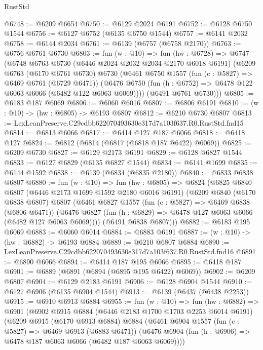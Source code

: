 \begin{lexlean}{RustStd}
\begin{coremodule}
@6748 := @6209 @6654
@6750 := @6129 @2024 @6191
@6752 := @6128 @6750 @1544
@6756 := @6127 @6752 (@6135 @6750 @1544)
@6757 := @6141 @2032
@6758 := @6144 @2034
@6761 := @6139 (@6757 (@6758 @2170))
@6763 := @6756 @6761 @6730
@6803 := fun (w : @10) =>
  fun (hw : @6728) =>
  @6747
    (@6748
      @6763
      @6730
      (@6446 @2024 @2032 @2034 @2170 @6018 @6191)
      (@6209
        @6763
        (@6170 @6761 @6730)
        @6730
        (@6461
          @6750
          @1557
          (fun (c : @5827) => @6469 @6761 (@6729 @6471))
          (@6476 @6750 (fun (h : @6752) => @6478 @122 @6063 @6066 (@6482 @122 @6063 @6069))))
        (@6491 @6761 @6730)))
@6805 := @6183 @187 @6069
@6806 := @6060 @6016
@6807 := @6806 @6191
@6810 := (w : @10) -> (hw : @6805) -> @6193 @6807
@6812 := @6210 @6730 @6807
@6813 := LexLeanPreserve.C29cdbb622070493630e317d7a103f637.R0.RustStd.fnd15
@6814 := @6813 @6066
@6817 := @6414 @127 @187 @6066
@6818 := @6418 @127
@6824 := @6812 (@6814 (@6817 (@6818 @187 @6422) @6069))
@6825 := @6209 @6730
@6827 := @6129 @2173 @6191
@6829 := @6128 @6827 @1544
@6833 := @6127 @6829 (@6135 @6827 @1544)
@6834 := @6141 @1699
@6835 := @6144 @1592
@6838 := @6139 (@6834 (@6835 @2180))
@6840 := @6833 @6838 @6807
@6880 := fun (w : @10) =>
  fun (hw : @6805) =>
  @6824
    (@6825
      @6840
      @6807
      (@6446 @2173 @1699 @1592 @2180 @6016 @6191)
      (@6209
        @6840
        (@6170 @6838 @6807)
        @6807
        (@6461
          @6827
          @1557
          (fun (c : @5827) => @6469 @6838 (@6806 @6471))
          (@6476 @6827 (fun (h : @6829) => @6478 @127 @6063 @6066 (@6482 @127 @6063 @6069))))
        (@6491 @6838 @6807)))
@6882 := @6183 @195 @6069
@6883 := @6060 @6014
@6884 := @6883 @6191
@6887 := (w : @10) -> (hw : @6882) -> @6193 @6884
@6889 := @6210 @6807 @6884
@6890 := LexLeanPreserve.C29cdbb622070493630e317d7a103f637.R0.RustStd.fnd16
@6891 := @6890 @6066
@6894 := @6414 @187 @195 @6066
@6895 := @6418 @187
@6901 := @6889 (@6891 (@6894 (@6895 @195 @6422) @6069))
@6902 := @6209 @6807
@6904 := @6129 @2183 @6191
@6906 := @6128 @6904 @1544
@6910 := @6127 @6906 (@6135 @6904 @1544)
@6913 := @6139 (@6437 (@6438 @2253))
@6915 := @6910 @6913 @6884
@6955 := fun (w : @10) =>
  fun (hw : @6882) =>
  @6901
    (@6902
      @6915
      @6884
      (@6446 @2183 @1700 @1703 @2253 @6014 @6191)
      (@6209
        @6915
        (@6170 @6913 @6884)
        @6884
        (@6461
          @6904
          @1557
          (fun (c : @5827) => @6469 @6913 (@6883 @6471))
          (@6476 @6904 (fun (h : @6906) => @6478 @187 @6063 @6066 (@6482 @187 @6063 @6069))))

\end{coremodule}
\end{lexlean}
